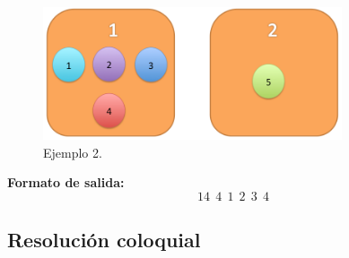 \begin{itemize}
\begin{figure}[H] %
\begin{center}
\includegraphics[width=250pt]{../imgs/ejemplo2ej1.jpg}
\caption{Ejemplo 2.}
\end{center}
\end{figure}

\textbf{Formato de salida:}
$$14\ \ 4\ \ 1\ \ 2\ \ 3\ \ 4$$
\end{itemize}

\subsection{Resolución coloquial}

